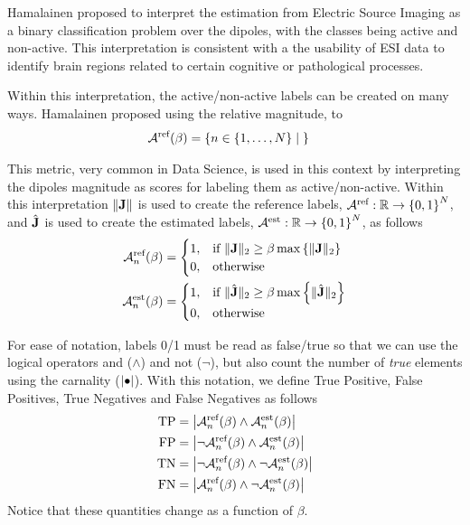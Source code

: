 Hamalainen proposed to interpret the estimation from Electric Source Imaging as a binary classification problem over the dipoles, with the classes being active and non-active.
%
This interpretation is consistent with a the usability of ESI data to identify brain regions related to certain cognitive or pathological processes.

Within this interpretation, the active/non-active labels can be created on many ways. 
%
Hamalainen proposed using the relative magnitude, to 
\begin{align}
\mathcal{A}^{\text{ref}}(\beta)
&=
\left\{ n\in\left\{ 1, \dots, N \right\} \;\middle|\;   \right\}
\end{align}

This metric, very common in Data Science, is used in this context by interpreting the dipoles magnitude as scores for labeling them as active/non-active.
%
Within this interpretation $\lVert \mathbf{J} \rVert$ is used to create the reference labels, $\mathcal{A}^{\text{ref}}: \mathbb{R} \rightarrow \left\{ 0,1 \right\}^N$, and $\hat{\mathbf{J}}$ is used to create the estimated labels, $\mathcal{A}^{\text{est}}: \mathbb{R} \rightarrow \left\{ 0,1 \right\}^N$, as follows
\begin{align}
\mathcal{A}_n^{\text{ref}}(\beta)
&=
\begin{cases}
1, &\text{if }
\lVert \mathbf{J} \rVert_2 \geq \beta \max\left\{ \lVert \mathbf{J} \rVert_2 \right\}
\\
0, &\text{otherwise}
\end{cases}
\\
\mathcal{A}_n^{\text{est}}(\beta)
&=
\begin{cases}
1, &\text{if }
\lVert \hat{\mathbf{J}} \rVert_2 \geq \beta \max\left\{ \lVert \hat{\mathbf{J}} \rVert_2 \right\}
\\
0, &\text{otherwise}
\end{cases}
\end{align}

For ease of notation, labels 0/1 must be read as false/true so that we can use the logical operators and ($\wedge$) and not ($\neg$), but also count the number of \textit{true} elements using the carnality ($\left| {\bullet} \right|$).
%
With this notation, we define True Positive, False Positives, True Negatives and False Negatives as follows
\begin{align}
\text{TP}
&=
\left| { 
\mathcal{A}_n^{\text{ref}}(\beta) \wedge 
\mathcal{A}_n^{\text{est}}(\beta) } \right|
\\
\text{FP}
&=
\left| { 
\neg \mathcal{A}_n^{\text{ref}}(\beta) \wedge 
\mathcal{A}_n^{\text{est}}(\beta) } \right|
\\
\text{TN}
&=
\left| { 
\neg \mathcal{A}_n^{\text{ref}}(\beta) \wedge 
\neg \mathcal{A}_n^{\text{est}}(\beta) } \right|
\\
\text{FN}
&=
\left| { 
\mathcal{A}_n^{\text{ref}}(\beta) \wedge 
\neg \mathcal{A}_n^{\text{est}}(\beta) } \right|
\end{align}
Notice that these quantities change as a function of $\beta$.

